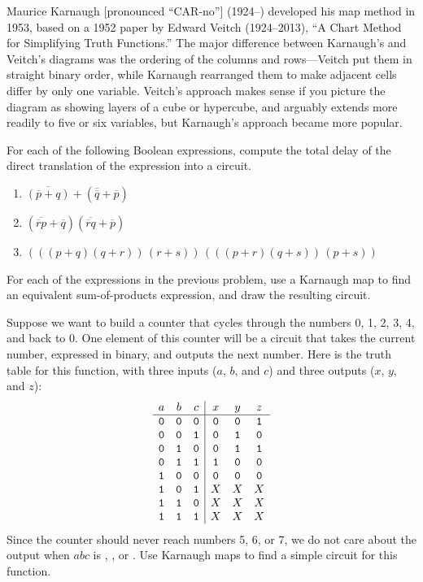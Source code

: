 \begin{tailquote}
Maurice Karnaugh [pronounced ``CAR-no''] (1924--) developed his map method in 1953, based on a 1952 paper by Edward Veitch (1924--2013), ``A Chart Method for Simplifying Truth Functions.'' The major difference between Karnaugh's and Veitch's diagrams was the ordering of the columns and rows---Veitch put them in straight binary order, while Karnaugh rearranged them to make adjacent cells differ by only one variable. Veitch's approach makes sense if you picture the diagram as showing layers of a cube or hypercube, and arguably extends more readily to five or six variables, but Karnaugh's approach became more popular.
\end{tailquote}

\begin{exercises}
\problem For each of the following Boolean expressions, compute the total delay of the direct translation of the expression into a circuit.
\begin{enumerate}
\item $\overline{(\overline{p}+q)}+(\overline{\overline{q}}+\overline{p})$
\item $(\overline{\overline{r}p}+\overline{q})(\overline{\overline{r}q}+\overline{p})$
\item $(((p+q)(q+r))\,(r+s))\,(((p+r)(q+s))\,(p+s))$
\end{enumerate}

\problem For each of the expressions in the previous problem, use a Karnaugh map to find an equivalent sum-of-products expression, and draw the resulting circuit.

\problem Suppose we want to build a counter that cycles through the numbers 0, 1, 2, 3, 4, and back to 0. One element of this counter will be a circuit that takes the current number, expressed in binary, and outputs the next number. Here is the truth table for this function, with three inputs ($a$, $b$, and $c$) and three outputs ($x$, $y$, and $z$):
\[ \begin{array}{ccc|ccc}
a & b & c & x & y & z\\ \hline
\mathtt{0} & \mathtt{0} & \mathtt{0} & \mathtt{0} & \mathtt{0} & \mathtt{1}\\
\mathtt{0} & \mathtt{0} & \mathtt{1} & \mathtt{0} & \mathtt{1} & \mathtt{0}\\
\mathtt{0} & \mathtt{1} & \mathtt{0} & \mathtt{0} & \mathtt{1} & \mathtt{1}\\
\mathtt{0} & \mathtt{1} & \mathtt{1} & \mathtt{1} & \mathtt{0} & \mathtt{0}\\
\mathtt{1} & \mathtt{0} & \mathtt{0} & \mathtt{0} & \mathtt{0} & \mathtt{0}\\
\mathtt{1} & \mathtt{0} & \mathtt{1} & X & X & X\\
\mathtt{1} & \mathtt{1} & \mathtt{0} & X & X & X\\
\mathtt{1} & \mathtt{1} & \mathtt{1} & X & X & X\\
\end{array} \]
Since the counter should never reach numbers 5, 6, or 7, we do not care about the output when $abc$ is \1\0\1, \1\1\0, or \1\1\1. Use Karnaugh maps to find a simple circuit for this function.


\end{exercises}
